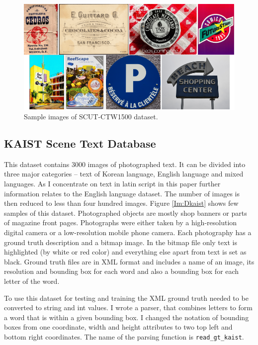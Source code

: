 \begin{figure}[hbtp]
    \centering
    \includegraphics[width=\textwidth]{obrazky/Dataset_ctw.png}
    \caption{Sample images of SCUT-CTW1500 dataset.}
    \label{Im:Dctw}
\end{figure}

\subsection*{KAIST Scene Text Database}

This dataset contains 3000 images of photographed text. It can be divided into three major categories -- text of Korean language, English language and mixed languages. As I concentrate on text in latin script in this paper further information relates to the English language dataset. The number of images is then reduced to less than four hundred images. Figure \ref*{Im:Dkaist} shows few samples of this dataset. Photographed objects are mostly shop banners or parts of magazine front pages. Photographs were either taken by a high-resolution digital camera or a low-resolution mobile phone camera.\cite{kaist} Each photography has a ground truth description and a bitmap image. In the bitmap file only text is highlighted (by white or red color) and everything else apart from text is set as black. Ground truth files are in XML format and includes a name of an image, its resolution and bounding box for each word and also a bounding box for each letter of the word.

To use this dataset for testing and training the XML ground truth needed to be converted to string and int values. I wrote a parser, that combines letters to form a word that is within a given bounding box. I changed the notation of bounding boxes from one coordinate, width and height attributes to two top left and bottom right coordinates. The name of the parsing function is \texttt{read\_gt\_kaist}.

